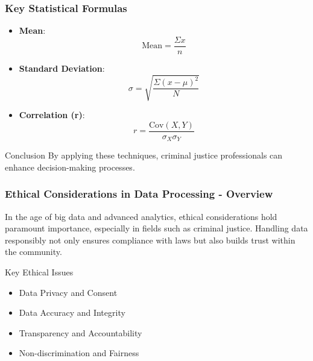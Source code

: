 \documentclass[aspectratio=169]{beamer}
\begin{document}
\begin{frame}[fragile]
    \frametitle{Key Statistical Formulas}
    \begin{itemize}
        \item \textbf{Mean}: 
        \begin{equation}
            \text{Mean} = \frac{\Sigma x}{n}
        \end{equation}
        \item \textbf{Standard Deviation}:
        \begin{equation}
            \sigma = \sqrt{\frac{\Sigma (x - \mu)^{2}}{N}}
        \end{equation}
        \item \textbf{Correlation (r)}:
        \begin{equation}
            r = \frac{\text{Cov}(X,Y)}{\sigma_{X} \sigma_{Y}}
        \end{equation}
    \end{itemize}
    \begin{block}{Conclusion}
        By applying these techniques, criminal justice professionals can enhance decision-making processes.
    \end{block}
\end{frame}

\begin{frame}[fragile]
    \frametitle{Ethical Considerations in Data Processing - Overview}
    In the age of big data and advanced analytics, ethical considerations hold paramount importance, especially in fields such as criminal justice. Handling data responsibly not only ensures compliance with laws but also builds trust within the community. 

    \begin{block}{Key Ethical Issues}
        \begin{itemize}
            \item Data Privacy and Consent
            \item Data Accuracy and Integrity
            \item Transparency and Accountability
            \item Non-discrimination and Fairness
        \end{itemize}
    \end{block}
\end{frame}
\end{document}
